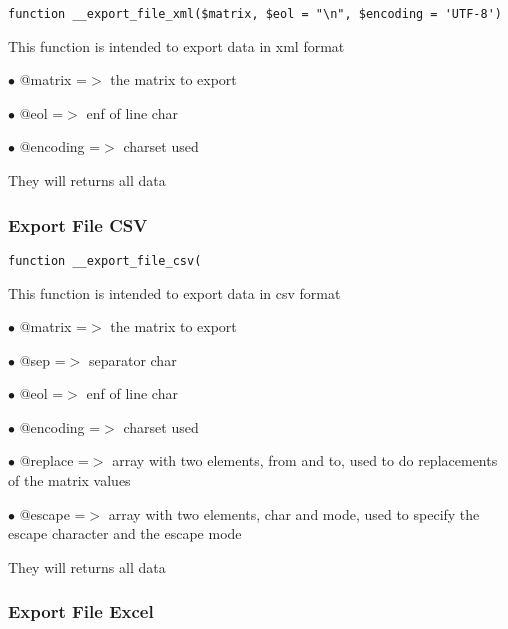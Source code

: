 \documentclass[a4paper]{article}
\begin{document}
\begin{lstlisting}
function __export_file_xml($matrix, $eol = "\n", $encoding = 'UTF-8')
\end{lstlisting}

This function is intended to export data in xml format

\begin{compactitem}
\item[\color{myblue}$\bullet$] @matrix   =$>$ the matrix to export
\item[\color{myblue}$\bullet$] @eol      =$>$ enf of line char
\item[\color{myblue}$\bullet$] @encoding =$>$ charset used
\end{compactitem}

They will returns all data

\hypertarget{toc441}{}
\subsubsection{Export File CSV}

\begin{lstlisting}
function __export_file_csv(
\end{lstlisting}

This function is intended to export data in csv format

\begin{compactitem}
\item[\color{myblue}$\bullet$] @matrix   =$>$ the matrix to export
\item[\color{myblue}$\bullet$] @sep      =$>$ separator char
\item[\color{myblue}$\bullet$] @eol      =$>$ enf of line char
\item[\color{myblue}$\bullet$] @encoding =$>$ charset used
\item[\color{myblue}$\bullet$] @replace  =$>$ array with two elements, from and to, used to do replacements of the matrix values
\item[\color{myblue}$\bullet$] @escape   =$>$ array with two elements, char and mode, used to specify the escape character and the
             escape mode
\end{compactitem}

They will returns all data

\hypertarget{toc442}{}
\subsubsection{Export File Excel}
\end{document}
